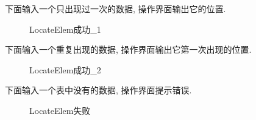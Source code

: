 \documentclass[supercite]{Experimental_Report}
\theoremstyle{definition}
\begin{document}
\noindent
下面输入一个只出现过一次的数据, 操作界面输出它的位置.
\begin{figure}[htbp]
	\centering
	\centering
	\caption{LocateElem成功\_1}
	\label{fig1-27}
\end{figure}

\noindent
下面输入一个重复出现的数据, 操作界面输出它第一次出现的位置.
\begin{figure}[htbp]
	\centering
	\centering
	\caption{LocateElem成功\_2}
	\label{fig1-28}
\end{figure}

\clearpage
\noindent
下面输入一个表中没有的数据, 操作界面提示错误.
\begin{figure}[htbp]
	\centering
	\centering
	\caption{LocateElem失败}
	\label{fig1-29}
\end{figure}
\end{document}
